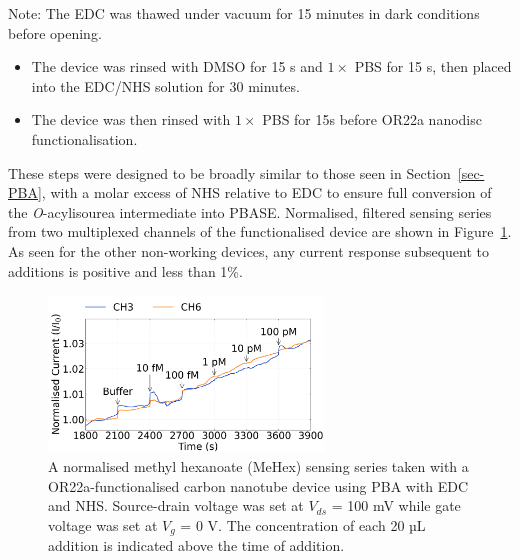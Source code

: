 \documentclass[
  a4paper,
]{scrbook}
\begin{document}
Note: The EDC was thawed under vacuum for 15 minutes in dark conditions
before opening.

\begin{itemize}
\item
  The device was rinsed with DMSO for 15 s and \(1 \times\) PBS for 15
  s, then placed into the EDC/NHS solution for 30 minutes.
\item
  The device was then rinsed with \(1 \times\) PBS for 15s before OR22a
  nanodisc functionalisation.
\end{itemize}

These steps were designed to be broadly similar to those seen in
Section~\ref{sec-PBA}, with a molar excess of NHS relative to EDC to
ensure full conversion of the \emph{O}-acylisourea intermediate into
PBASE. Normalised, filtered sensing series from two multiplexed channels
of the functionalised device are shown in
Figure~\ref{fig-EDCNHS-sensing}. As seen for the other non-working
devices, any current response subsequent to additions is positive and
less than 1\%.

\begin{figure}

{\centering \includegraphics[width=0.65\textwidth,height=\textheight]{figures/ch7/NTQ25D3_OR22a_sample_220218_EDCNHS.png}

}

\caption[A normalised methyl hexanoate (MeHex) sensing series taken with
a OR22a-functionalised carbon nanotube device using PBA with EDC and
NHS.]{\label{fig-EDCNHS-sensing}A normalised methyl hexanoate (MeHex)
sensing series taken with a OR22a-functionalised carbon nanotube device
using PBA with EDC and NHS. Source-drain voltage was set at \(V_{ds}\) =
100 mV while gate voltage was set at \(V_g\) = 0 V. The concentration of
each 20 µL addition is indicated above the time of addition.}

\end{figure}
\end{document}
